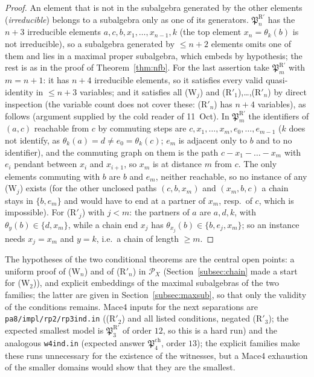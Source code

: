 \documentclass[11pt]{amsart}
\theoremstyle{definition}
\renewcommand{\P}{\mathcal{P}}
\begin{document}
\begin{proof}
An element that is not in the subalgebra generated by the other elements (\emph{irreducible}) belongs to a subalgebra only as one of its generators. $\mathfrak P^{\mathrm R'}_n$ has the $n+3$ irreducible elements $a,c,b,x_1,\dots,x_{n-1},k$ (the top element $x_n=\theta_k(b)$ is not irreducible), so a subalgebra generated by $\le n+2$ elements omits one of them and lies in a maximal proper subalgebra, which embeds by hypothesis; the rest is as in the proof of Theorem~\ref{thm:nfb}. For the last assertion take $\mathfrak P^{\mathrm R'}_{m}$ with $m=n+1$: it has $n+4$ irreducible elements, so it satisfies every valid quasi-identity in $\le n+3$ variables; and it satisfies all (W$_j$) and (R$'_1$),\dots,(R$'_n$) by direct inspection (the variable count does not cover these: (R$'_n$) has $n+4$ variables), as follows (argument supplied by the cold reader of 11~Oct). In $\mathfrak P^{\mathrm R'}_m$ the identifiers of $(a,c)$ reachable from $c$ by commuting steps are $c,x_1,\dots,x_m,e_0,\dots,e_{m-1}$ ($k$ does not identify, as $\theta_k(a)=d\ne e_0=\theta_k(c)$; $e_m$ is adjacent only to $b$ and to no identifier), and the commuting graph on them is the path $c-x_1-\dots-x_m$ with $e_i$ pendant between $x_i$ and $x_{i+1}$, so $x_m$ is at distance $m$ from $c$. The only elements commuting with $b$ are $b$ and $e_m$, neither reachable, so no instance of any (W$_j$) exists (for the other unclosed paths $(c,b,x_m)$ and $(x_m,b,c)$ a chain stays in $\{b,e_m\}$ and would have to end at a partner of $x_m$, resp.\ of $c$, which is impossible). For (R$'_j$) with $j<m$: the partners of $a$ are $a,d,k$, with $\theta_y(b)\in\{d,x_m\}$, while a chain end $x_j$ has $\theta_{x_j}(b)\in\{b,e_j,x_m\}$; so an instance needs $x_j=x_m$ and $y=k$, i.e.\ a chain of length $\ge m$.
\end{proof}

The hypotheses of the two conditional theorems are the central open points: a uniform proof of (W$_n$) and of (R$'_n$) in $\P_X$ (Section~\ref{subsec:chain} made a start for (W$_2$)), and explicit embeddings of the maximal subalgebras of the two families; the latter are given in Section~\ref{subsec:maxsub}, so that only the validity of the conditions remains. Mace4 inputs for the next separations are \texttt{pa8/impl/rp2/rp3ind.in} ((R$'_2$) and all listed conditions, negated (R$'_3$); the expected smallest model is $\mathfrak P^{\mathrm R'}_3$ of order $12$, so this is a hard run) and the analogous \texttt{w4ind.in} (expected answer $\mathfrak P^{\mathrm{ch}}_4$, order $13$); the explicit families make these runs unnecessary for the existence of the witnesses, but a Mace4 exhaustion of the smaller domains would show that they are the smallest.
\end{document}
